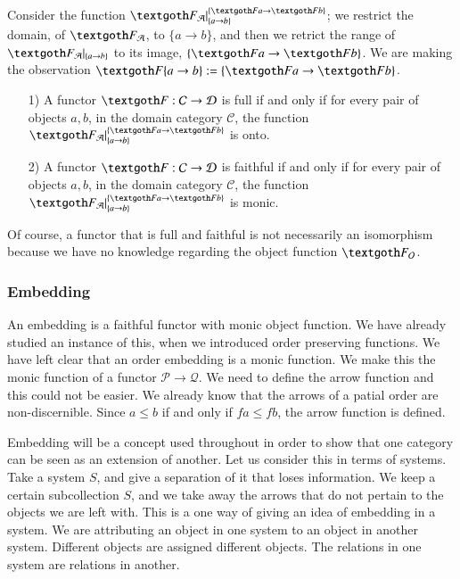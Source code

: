 \documentclass [12pt]{book}
\begin{document}
Consider the function $\textgoth F_\mathcal A|_{\{a\rightarrow b\}}^{\{\textgoth Fa\rightarrow\textgoth Fb\}}$; we restrict the domain, of $\textgoth F_\mathcal A$, to $\{a\rightarrow b\}$, and then we retrict the range of $\textgoth F_\mathcal A|_{\{a\rightarrow b\}}$ to its image, $\{\textgoth Fa\rightarrow\textgoth Fb\}$. We are making the observation $\textgoth F\{a\rightarrow b\}:=\{\textgoth Fa\rightarrow\textgoth Fb\}$.

\begin{proposition}\makebox[5pt][]{}\mbox {}\begin{itemize}\item[1)]A functor $\textgoth F:\mathcal C\rightarrow\mathcal D$ is full if and only if for every pair of objects $a,b$, in the domain category $\mathcal C$, the function $\textgoth F_{\mathcal A}|_{\{a\rightarrow b\}}^{\{\textgoth Fa\rightarrow\textgoth Fb\}}$ is onto.\item[2)]A functor $\textgoth F:\mathcal C\rightarrow\mathcal D$ is faithful if and only if for every pair of objects $a,b$, in the domain category $\mathcal C$, the function $\textgoth F_{\mathcal A}|_{\{a\rightarrow b\}}^{\{\textgoth Fa\rightarrow\textgoth Fb\}}$ is monic.\end{itemize}\end{proposition}Of course, a functor that is full and faithful is not necessarily an isomorphism because we have no knowledge regarding the object function $\textgoth F_\mathcal O$.

			\subsubsection{Embedding}

An embedding is a faithful functor with monic object function. We have already studied an instance of this, when we introduced order preserving functions. We have left clear that an order embedding is a monic function. We make this the monic function  of a functor $\mathcal P\rightarrow\mathcal Q$. We need to define the arrow function and this could not be easier. We already know that the arrows of a patial order are non-discernible. Since $a\leq b$ if and only if $fa\leq fb$, the arrow function is defined.

Embedding will be a concept used throughout in order to show that one category can be seen as an extension of another. Let us consider this in terms of systems. Take a system $S$, and give a separation of it that loses information. We keep a certain subcollection $S$, and we take away the arrows that do not pertain to the objects we are left with. This is a one way of giving an idea of embedding in a system. We are attributing an object in one system to an object in another system. Different objects are assigned different objects. The relations in one system are relations in another.
\end{document}
